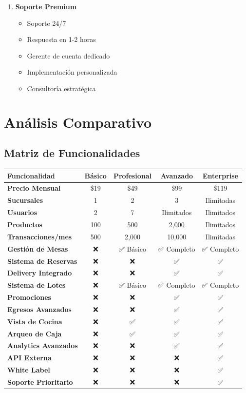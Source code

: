 \documentclass[12pt,a4paper]{article}
\begin{document}
\begin{enumerate}
    \item \textbf{Soporte Premium}
    \begin{itemize}
        \item Soporte 24/7
        \item Respuesta en 1-2 horas
        \item Gerente de cuenta dedicado
        \item Implementación personalizada
        \item Consultoría estratégica
    \end{itemize}
\end{enumerate}

\section{Análisis Comparativo}

\subsection{Matriz de Funcionalidades}

\begin{longtable}{|p{3cm}|c|c|c|c|}
\hline
\textbf{Funcionalidad} & \textbf{Básico} & \textbf{Profesional} & \textbf{Avanzado} & \textbf{Enterprise} \\
\hline
\textbf{Precio Mensual} & \$19 & \$49 & \$99 & \$119 \\
\hline
\textbf{Sucursales} & 1 & 2 & 3 & Ilimitadas \\
\hline
\textbf{Usuarios} & 2 & 7 & Ilimitados & Ilimitados \\
\hline
\textbf{Productos} & 100 & 500 & 2,000 & Ilimitados \\
\hline
\textbf{Transacciones/mes} & 500 & 2,000 & 10,000 & Ilimitadas \\
\hline
\textbf{Gestión de Mesas} & ❌ & ✅ Básico & ✅ Completo & ✅ Completo \\
\hline
\textbf{Sistema de Reservas} & ❌ & ❌ & ✅ & ✅ \\
\hline
\textbf{Delivery Integrado} & ❌ & ❌ & ✅ & ✅ \\
\hline
\textbf{Sistema de Lotes} & ❌ & ✅ Básico & ✅ Completo & ✅ Completo \\
\hline
\textbf{Promociones} & ❌ & ❌ & ✅ & ✅ \\
\hline
\textbf{Egresos Avanzados} & ❌ & ❌ & ✅ & ✅ \\
\hline
\textbf{Vista de Cocina} & ❌ & ✅ & ✅ & ✅ \\
\hline
\textbf{Arqueo de Caja} & ❌ & ✅ & ✅ & ✅ \\
\hline
\textbf{Analytics Avanzados} & ❌ & ❌ & ✅ & ✅ \\
\hline
\textbf{API Externa} & ❌ & ❌ & ❌ & ✅ \\
\hline
\textbf{White Label} & ❌ & ❌ & ❌ & ✅ \\
\hline
\textbf{Soporte Prioritario} & ❌ & ❌ & ❌ & ✅ \\
\hline
\end{longtable}
\end{document}
